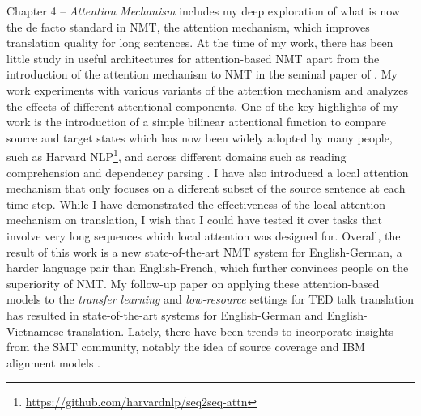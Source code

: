 Chapter 4 -- {\it Attention Mechanism} includes my deep exploration of what is
now the de facto standard in NMT, the attention mechanism, which improves
translation quality for long sentences. At the time of my work, there has been
little study in useful architectures for attention-based NMT apart from the
introduction of the attention mechanism to NMT in the seminal paper of
. My work experiments with various variants of the attention
mechanism and analyzes the effects of different attentional components. One of
the key highlights of my work is the introduction of a simple bilinear
attentional function to compare source and target states which has now been
widely adopted by many people, such as Harvard
NLP\footnote{\url{https://github.com/harvardnlp/seq2seq-attn}}, and across
different domains such as reading comprehension \cite{chen16} and dependency
parsing \cite{dozat16}. I have also introduced a local attention mechanism that
only focuses on a different subset of the source sentence at each time step.
While I have demonstrated the effectiveness of the local attention mechanism on
translation, I wish that I could have tested it over tasks that involve very
long sequences which local attention was designed for. Overall, the result of
this work is a new state-of-the-art NMT system for English-German, a harder
language pair than English-French, which further convinces people on the
superiority of NMT.
My follow-up paper \cite{luong15iwslt} on applying these
attention-based models to the {\it transfer learning} and {\it low-resource}
settings for TED talk translation has resulted in state-of-the-art systems for
English-German and English-Vietnamese translation.
Lately, there have been trends to
incorporate insights from the SMT community, notably the idea of source coverage
and IBM alignment models \cite{cohn16,tu16coverage}.


